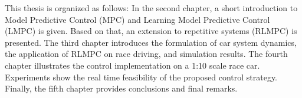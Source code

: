 This thesis is organized as follows: In the second chapter, a short introduction to Model Predictive Control (MPC) and Learning Model Predictive Control (LMPC) is given. Based on that, an extension to repetitive systems (RLMPC) is presented. The third chapter introduces the formulation of car system dynamics, the application of RLMPC on race driving, and simulation results. The fourth chapter illustrates the control implementation on a 1:10 scale race car. Experiments show the real time feasibility of the proposed control strategy. Finally, the fifth chapter provides conclusions and final remarks.
